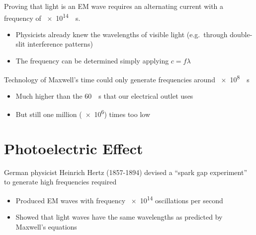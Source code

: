 Proving that light is an EM wave requires an alternating current with a
frequency of \SI{e14}{\per\second}.
\begin{itemize}
\item Physicists already knew the wavelengths of visible light (e.g.\ through
  double-slit interference patterns)
\item The frequency can be determined simply applying $c=f\lambda$
\end{itemize}

Technology of Maxwell's time could only generate frequencies
around \SI{e8}{\per\second}
\begin{itemize}
\item Much higher than the \SI{60}{\per\second} that our electrical outlet
  uses
\item But still one million (\num{e6}) times too low
\end{itemize}




\section{Photoelectric Effect}

%
%
%
%
German physicist Heinrich Hertz (1857-1894) devised a ``spark gap experiment''
to generate high frequencies required
\begin{figure}[ht]
  \centering
\end{figure}
\begin{itemize}
\item Produced EM waves with frequency \num{e14} oscillations per second
\item Showed that light waves have the same wavelengths as predicted by
  Maxwell's equations
\end{itemize}

